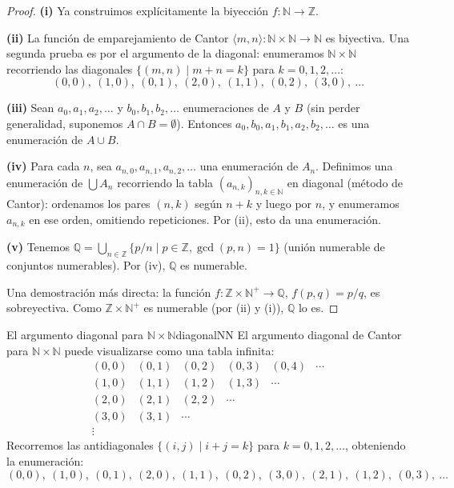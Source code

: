 \begin{proof}
\textbf{(i)} Ya construimos explícitamente la biyección $f: \mathbb{N} \to \mathbb{Z}$.

\textbf{(ii)} La función de emparejamiento de Cantor $\langle m, n \rangle: \mathbb{N} \times \mathbb{N} \to \mathbb{N}$ es biyectiva. Una segunda prueba es por el argumento de la diagonal: enumeramos $\mathbb{N} \times \mathbb{N}$ recorriendo las diagonales $\{(m,n) \mid m + n = k\}$ para $k = 0, 1, 2, \ldots$:
\[
  (0,0),\ (1,0),\ (0,1),\ (2,0),\ (1,1),\ (0,2),\ (3,0),\ \ldots
\]

\textbf{(iii)} Sean $a_0, a_1, a_2, \ldots$ y $b_0, b_1, b_2, \ldots$ enumeraciones de $A$ y $B$ (sin perder generalidad, suponemos $A \cap B = \emptyset$). Entonces $a_0, b_0, a_1, b_1, a_2, b_2, \ldots$ es una enumeración de $A \cup B$.

\textbf{(iv)} Para cada $n$, sea $a_{n,0}, a_{n,1}, a_{n,2}, \ldots$ una enumeración de $A_n$. Definimos una enumeración de $\bigcup A_n$ recorriendo la tabla $(a_{n,k})_{n,k \in \mathbb{N}}$ en diagonal (método de Cantor): ordenamos los pares $(n,k)$ según $n+k$ y luego por $n$, y enumeramos $a_{n,k}$ en ese orden, omitiendo repeticiones. Por (ii), esto da una enumeración.

\textbf{(v)} Tenemos $\mathbb{Q} = \bigcup_{n \in \mathbb{Z}} \{p/n \mid p \in \mathbb{Z}, \gcd(p,n) = 1\}$ (unión numerable de conjuntos numerables). Por (iv), $\mathbb{Q}$ es numerable.

Una demostración más directa: la función $f: \mathbb{Z} \times \mathbb{N}^+ \to \mathbb{Q}$, $f(p,q) = p/q$, es sobreyectiva. Como $\mathbb{Z} \times \mathbb{N}^+$ es numerable (por (ii) y (i)), $\mathbb{Q}$ lo es.
\end{proof}

\begin{ejemplo}{El argumento diagonal para $\mathbb{N} \times \mathbb{N}$}{diagonalNN}
El argumento diagonal de Cantor para $\mathbb{N} \times \mathbb{N}$ puede visualizarse como una tabla infinita:
\[
\begin{array}{cccccc}
(0,0) & (0,1) & (0,2) & (0,3) & (0,4) & \cdots \\
(1,0) & (1,1) & (1,2) & (1,3) & \cdots  & \\
(2,0) & (2,1) & (2,2) & \cdots  &  & \\
(3,0) & (3,1) & \cdots  &  &  & \\
\vdots &  &  &  &  &
\end{array}
\]
Recorremos las antidiagonales $\{(i,j) \mid i+j = k\}$ para $k = 0, 1, 2, \ldots$, obteniendo la enumeración:
\[
(0,0),\ (1,0),\ (0,1),\ (2,0),\ (1,1),\ (0,2),\ (3,0),\ (2,1),\ (1,2),\ (0,3),\ \ldots
\]
\end{ejemplo}

